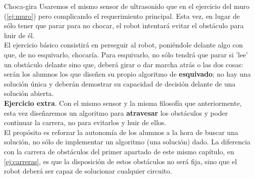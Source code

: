 \begin{description}
\item{Choca-gira}\label{ej:chocaGira}
Usaremos el mismo sensor de ultrasonido que en el ejercicio del muro (\ref{ej:muro}) pero complicando el requerimiento principal. Esta vez, en lugar de sólo tener que parar para no chocar, el robot intentará evitar el obstáculo para huir de él. \\
El ejercicio básico consistirá en perseguir al robot, poniéndole delante algo con que, de no esquivarlo, chocaría. Para esquivarlo, no sólo tendrá que parar si 'lee' un obstáculo delante sino que, deberá girar o dar marcha atrás o las dos cosas: serán los alumnos los que diseñen su propio algoritmo de \textbf{esquivado}; no hay una solución única y deberán demostrar su capacidad de decisión delante de una solución abierta. \\
\textbf{Ejercicio extra}. Con el mismo sensor y la misma filosofía que anteriormente, esta vez diseñaremos un algoritmo para \textbf{atravesar} los obstáculos y poder continuar la carrera, no para evitarlos y huir de ellos. \\
El propósito es reforzar la autonomía de los alumnos a la hora de buscar una solución, no sólo de implementar un algoritmo (una solución) dado. La diferencia con la carrera de obstáculos del primer apartado de este mismo capítulo, en \ref{ej:carreras}, es que la disposición de estos obstáculos no será fija, sino que el robot deberá ser capaz de solucionar cualquier circuito.
\end{description}
